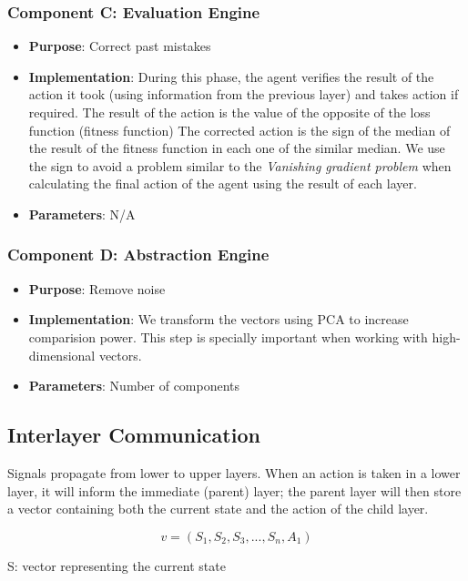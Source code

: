 \documentclass[12pt]{article}
\begin{document}
\subsubsection{Component C: Evaluation Engine}
\begin{itemize}
    \item \textbf{Purpose}: Correct past mistakes
    \item \textbf{Implementation}:
        During this phase, the agent verifies the result of the action it took (using information from the previous layer)
        and takes action if required. The result of the action is the value of the opposite of the loss function (fitness function)
        The corrected action is the sign of the median of the result of the fitness function in each one of the similar median.
        We use the sign to avoid a problem similar to the \emph{Vanishing gradient problem} when calculating the final action of
        the agent using the result of each layer.
\item \textbf{Parameters}: N/A
\end{itemize}

\subsubsection{Component D: Abstraction Engine}
\begin{itemize}
    \item \textbf{Purpose}: Remove noise
    \item \textbf{Implementation}:
        We transform the vectors using PCA to increase comparision power.
        This step is specially important when working with high-dimensional vectors.
    \item \textbf{Parameters}: Number of components
\end{itemize}

\subsection{Interlayer Communication}
Signals propagate from lower to upper layers. When an action is taken in a lower layer, it will inform the immediate (parent) layer; the parent layer will then store a vector containing both the current state and the action of the child layer.

\begin{equation}
    v = (S_1, S_2, S_3, ..., S_n, A_1)
\end{equation}

S: vector representing the current state
\end{document}
